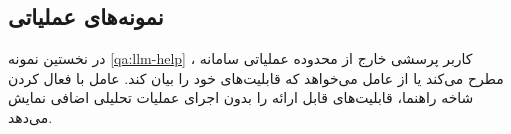 \subsection{نمونه‌های عملیاتی}

در نخستین نمونه
\ref{qa:llm-help}
، کاربر پرسشی خارج از محدوده عملیاتی سامانه مطرح می‌کند یا از عامل می‌خواهد که قابلیت‌های خود را بیان کند. عامل با فعال کردن شاخه راهنما، قابلیت‌های قابل ارائه را بدون اجرای عملیات تحلیلی اضافی نمایش می‌دهد.




